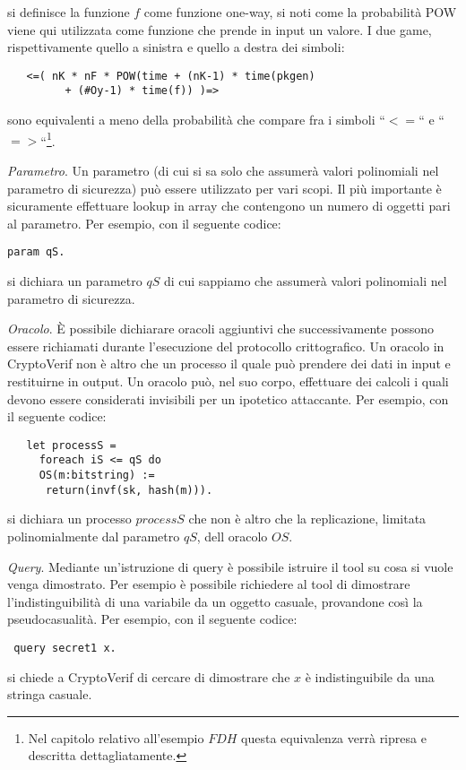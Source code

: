 \documentclass[a4paper,openright,twoside,12pt]{report}
\begin{document}
\begin{description}
si definisce la funzione $f$ come funzione one-way, si noti come la probabilit\`a POW viene qui utilizzata come funzione che prende in input un valore. I
due game, rispettivamente quello a sinistra e quello a destra dei simboli:

\begin{verbatim}
   <=( nK * nF * POW(time + (nK-1) * time(pkgen)
         + (#Oy-1) * time(f)) )=>
\end{verbatim}
 

sono equivalenti a meno della probabilit\`a che compare fra i simboli ``$<=$`` e ``$=>$``\footnote{
Nel capitolo relativo all'esempio $FDH$ questa equivalenza verr\`a ripresa e descritta dettagliatamente.}.
 \item{\emph{Parametro}.} Un parametro (di cui si sa solo che assumer\`a valori polinomiali nel parametro di sicurezza) pu\`o essere utilizzato per vari scopi.
		  Il pi\`u importante \`e sicuramente effettuare lookup in array che contengono un numero di oggetti pari al parametro.
Per esempio, con il seguente codice:
 

\begin{verbatim}
param qS.
\end{verbatim}
 
si dichiara un parametro $qS$ di cui sappiamo che assumer\`a valori polinomiali nel parametro di sicurezza.	    
 \item{\emph{Oracolo}.} \`E possibile dichiarare oracoli aggiuntivi che successivamente possono essere richiamati durante l'esecuzione
			  del protocollo crittografico. Un oracolo in CryptoVerif non \`e altro che un processo il quale pu\`o prendere
			  dei dati in input e restituirne in output. Un oracolo pu\`o, nel suo corpo, effettuare dei calcoli i quali devono
			  essere considerati invisibili per un ipotetico attaccante. Per esempio, con il seguente codice:

 \begin{verbatim}
   let processS =
     foreach iS <= qS do
     OS(m:bitstring) :=
      return(invf(sk, hash(m))).
 \end{verbatim}
 

si dichiara un processo $processS$ che non \`e altro che la replicazione, limitata polinomialmente dal parametro $qS$, dell oracolo $OS$.

 \item{\emph{Query}.} Mediante un'istruzione di query \`e possibile istruire il tool su cosa si vuole venga dimostrato. Per esempio \`e possibile richiedere
		    al tool di dimostrare l'indistinguibilit\`a di una variabile da un oggetto casuale, provandone cos\`i la pseudocasualit\`a.	Per esempio, con il seguente codice:
 
\begin{verbatim}
 query secret1 x.
\end{verbatim}
 
si chiede a CryptoVerif di cercare di dimostrare che $x$ \`e indistinguibile da una stringa casuale.

\end{description}
\end{document}
